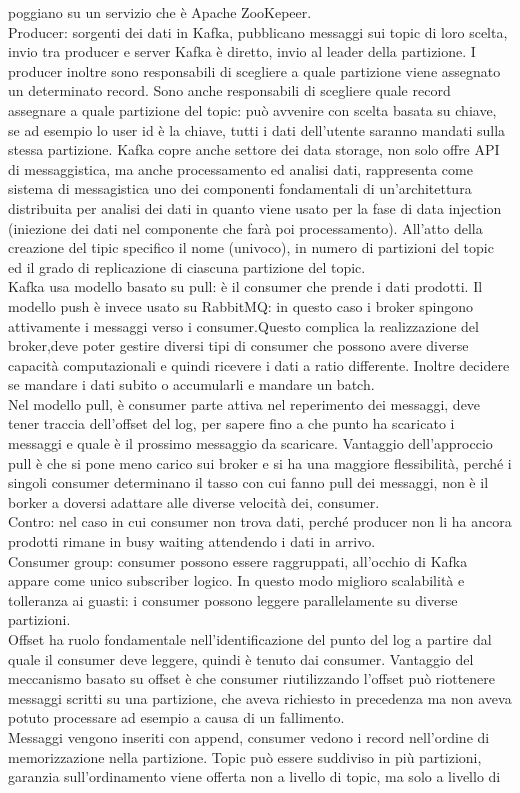\documentclass{article}
\begin{document}
poggiano su un servizio che è Apache ZooKepeer.\\ Producer: sorgenti dei dati in Kafka, pubblicano messaggi sui topic di loro scelta, invio tra producer e server Kafka è diretto, invio al leader della partizione. I producer inoltre sono responsabili di scegliere a quale partizione viene assegnato un determinato record. Sono anche responsabili di scegliere quale record assegnare a quale partizione del topic: può avvenire con scelta basata su chiave, se ad esempio lo user id è la chiave, tutti i dati dell'utente saranno mandati sulla stessa partizione.
Kafka copre anche settore dei data storage, non solo offre API di messaggistica, ma anche processamento ed analisi dati, rappresenta come sistema di messagistica uno dei componenti fondamentali di un'architettura distribuita per analisi dei dati in quanto viene usato per la fase di data injection (iniezione dei dati nel componente che farà poi processamento). All'atto della creazione del tipic specifico il nome (univoco), in numero di partizioni del topic ed il grado di replicazione di ciascuna partizione del topic.\\ Kafka usa modello basato su pull: è il consumer che prende i dati prodotti. Il modello push è invece usato su RabbitMQ: in questo caso i broker spingono attivamente i messaggi verso i consumer.Questo complica la realizzazione del broker,deve poter gestire diversi tipi di consumer che possono avere diverse capacità computazionali e quindi ricevere i dati a ratio differente. Inoltre decidere se mandare i dati subito o accumularli e mandare un batch.\\ Nel modello pull, è consumer parte attiva nel reperimento dei messaggi, deve tener traccia dell'offset del log, per sapere fino a che punto ha scaricato i messaggi e quale è il prossimo messaggio da scaricare. Vantaggio dell'approccio pull è che si pone meno carico sui broker e si ha una maggiore flessibilità, perché i singoli consumer determinano il tasso con cui fanno pull dei messaggi, non è il borker a doversi adattare alle diverse velocità dei, consumer. \\ Contro: nel caso in cui consumer non trova dati, perché producer non li ha ancora prodotti rimane in busy waiting attendendo i dati in arrivo.\\ Consumer group: consumer possono essere raggruppati, all'occhio di Kafka appare come unico subscriber logico. In questo modo miglioro scalabilità e tolleranza ai guasti: i consumer possono leggere parallelamente su diverse partizioni.\\ Offset ha ruolo fondamentale nell'identificazione del punto del log a partire dal quale il consumer deve leggere, quindi è tenuto dai consumer. Vantaggio del meccanismo basato su offset è che consumer riutilizzando l'offset può riottenere messaggi scritti su una partizione, che aveva richiesto in precedenza ma non aveva potuto processare ad esempio a causa di un fallimento.\\ Messaggi vengono inseriti con append, consumer vedono i record nell'ordine di memorizzazione nella partizione. Topic può essere suddiviso in più partizioni, garanzia sull'ordinamento viene offerta non a livello di topic, ma solo a livello di 
\end{document}
